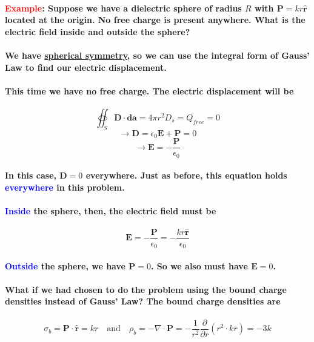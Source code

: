 \documentclass{article}
\begin{document}
\paragraph{\textcolor{red}{Example}: Suppose we have a dielectric sphere of radius $R$ with $\boldsymbol{P}=kr\hat{\boldsymbol{r}}$ located at the origin. No free charge is present anywhere. What is the electric field inside and outside the sphere?}
\paragraph{We have \underline{spherical symmetry}, so we can use the integral form of Gauss' Law to find our electric displacement.}
\paragraph{This time we have no free charge. The electric displacement will be}
\begin{equation*}
    \oiint_S\boldsymbol{D}\cdot\boldsymbol{da}=4\pi r^2D_s=Q_{free}=0
\end{equation*}
\begin{equation*}
    \rightarrow\boldsymbol{D}=\epsilon_0\boldsymbol{E}+\boldsymbol{P}=0
\end{equation*}
\begin{equation*}
    \rightarrow\boldsymbol{E}=-\frac{\boldsymbol{P}}{\epsilon_0}
\end{equation*}
\paragraph{In this case, $\boldsymbol{D}=0$ everywhere. Just as before, this equation holds \textcolor{blue}{everywhere} in this problem.}
\paragraph{\textcolor{blue}{Inside} the sphere, then, the electric field must be}
\begin{equation*}
    \boldsymbol{E}=-\frac{\boldsymbol{P}}{\epsilon_0}=-\frac{kr\hat{\boldsymbol{r}}}{\epsilon_0}
\end{equation*}
\paragraph{\textcolor{blue}{Outside} the sphere, we have $\boldsymbol{P}=0$. So we also must have $\boldsymbol{E}=0$.}
\paragraph{What if we had chosen to do the problem using the bound charge densities instead of Gauss' Law? The bound charge densities are}
\begin{equation*}
    \sigma_b=\boldsymbol{P}\cdot \hat{\boldsymbol{r}}=kr\quad \text{and}\quad \rho_b=-\nabla\cdot\boldsymbol{P}=-\frac{1}{r^2}\frac{\partial}{\partial r}(r^2\cdot kr)=-3k
\end{equation*}
\end{document}
